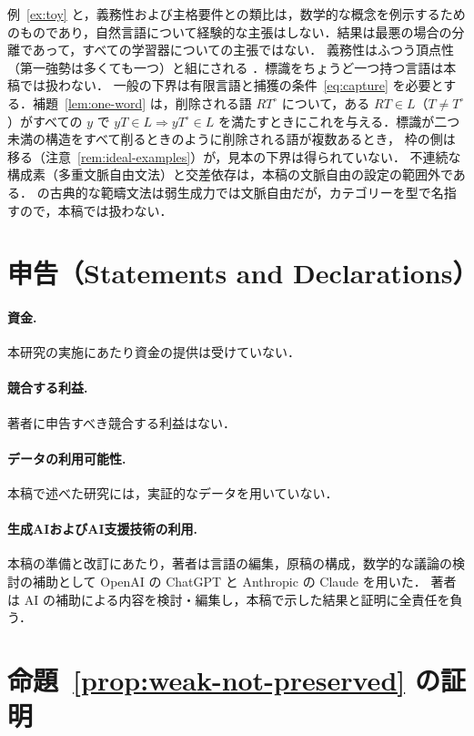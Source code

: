 \documentclass[11pt,a4paper]{ltjsarticle}
\numberwithin{equation}{section}
\theoremstyle{plain}
\theoremstyle{definition}
\theoremstyle{remark}
\theoremstyle{plain}
\begin{document}
例~\ref{ex:toy} と，義務性および主格要件との類比は，数学的な概念を例示するためのものであり，自然言語について経験的な主張はしない．結果は最悪の場合の分離であって，すべての学習器についての主張ではない．
義務性はふつう頂点性（第一強勢は多くても一つ）と組にされる \citep{hyman2006}．標識をちょうど一つ持つ言語は本稿では扱わない．
一般の下界は有限言語と捕獲の条件~\eqref{eq:capture} を必要とする．補題~\ref{lem:one-word} は，削除される語 $RT^\circ$ について，ある $RT\in L$（$T\ne T^\circ$）がすべての $y$ で $yT\in L\Rightarrow yT^\circ\in L$ を満たすときにこれを与える．標識が二つ未満の構造をすべて削るときのように削除される語が複数あるとき，
枠の側は移る（注意~\ref{rem:ideal-examples}）が，見本の下界は得られていない．
不連続な構成素（多重文脈自由文法）と交差依存は，本稿の文脈自由の設定の範囲外である．\citet{kanazawa1998} の古典的な範疇文法は弱生成力では文脈自由だが，カテゴリーを型で名指すので，本稿では扱わない．

\section*{申告（Statements and Declarations）}

\paragraph{資金.}
本研究の実施にあたり資金の提供は受けていない．

\paragraph{競合する利益.}
著者に申告すべき競合する利益はない．

\paragraph{データの利用可能性.}
本稿で述べた研究には，実証的なデータを用いていない．

\paragraph{生成AIおよびAI支援技術の利用.}
本稿の準備と改訂にあたり，著者は言語の編集，原稿の構成，数学的な議論の検討の補助として OpenAI の ChatGPT と Anthropic の Claude を用いた．
著者は AI の補助による内容を検討・編集し，本稿で示した結果と証明に全責任を負う．

\appendix
\section{命題~\ref{prop:weak-not-preserved} の証明}\label{app:weak}
\end{document}
